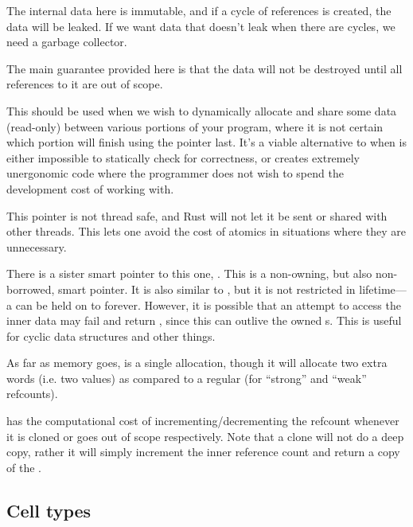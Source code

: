 \blank

The internal data here is immutable, and if a cycle of references is created, the data will be leaked. If we want data 
that doesn't leak when there are cycles, we need a garbage collector.


The main guarantee provided here is that the data will not be destroyed until all references to it are out of scope.

\blank

This should be used when we wish to dynamically allocate and share some data (read-only) between various portions of your 
program, where it is not certain which portion will finish using the pointer last. It's a viable alternative to  
when  is either impossible to statically check for correctness, or creates extremely unergonomic code where the 
programmer does not wish to spend the development cost of working with.

\blank

This pointer is not thread safe, and Rust will not let it be sent or shared with other threads. This lets one avoid the 
cost of atomics in situations where they are unnecessary.

\blank

There is a sister smart pointer to this one, . This is a non-owning, but also non-borrowed, smart pointer. It 
is also similar to , but it is not restricted in lifetime—a  can be held on to forever. However, it 
is possible that an attempt to access the inner data may fail and return \none, since this can outlive the owned s. 
This is useful for cyclic data structures and other things.


As far as memory goes,  is a single allocation, though it will allocate two extra words (i.e. two  
values) as compared to a regular  (for \enquote{strong} and \enquote{weak} refcounts).

\blank

 has the computational cost of incrementing/decrementing the refcount whenever it is cloned or goes out of 
scope respectively. Note that a clone will not do a deep copy, rather it will simply increment the inner reference count 
and return a copy of the .

\subsection*{Cell types}

